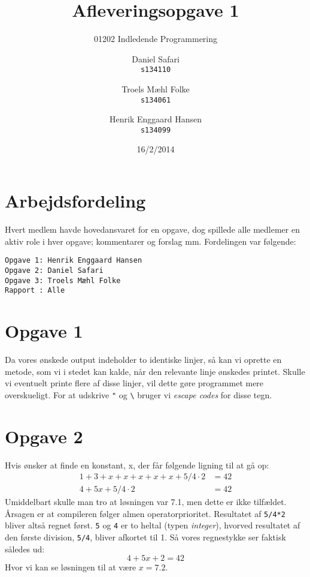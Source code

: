 \documentclass{scrartcl}
\newcommand\code[1]{\texttt{#1}}
\begin{document}

\title{Afleveringsopgave 1}
\subtitle{01202 Indledende Programmering}
\author{
  Daniel Safari\\
  \texttt{s134110}
  \and
  Troels Mæhl Folke\\
  \texttt{s134061}
   \and
  Henrik Enggaard Hansen\\
  \texttt{s134099}
}
\date{16/2/2014}
\maketitle
\thispagestyle{empty}
\setcounter{page}{0}
\null
\vfill
\section*{Arbejdsfordeling}
Hvert medlem havde hovedansvaret for en opgave, dog spillede alle medlemer en aktiv role i hver opgave; kommentarer og forslag mm. Fordelingen var følgende:
\begin{Verbatim}
Opgave 1: Henrik Enggaard Hansen
Opgave 2: Daniel Safari
Opgave 3: Troels Mæhl Folke
Rapport : Alle
\end{Verbatim}
\newpage
\section*{Opgave 1}
Da vores ønskede output indeholder to identiske linjer, så kan vi oprette en metode, som vi i stedet kan kalde, når den relevante linje ønskedes printet. Skulle vi eventuelt printe flere af disse linjer, vil dette gøre programmet mere overskueligt. For at udskrive \code{"} og \code{\textbackslash} bruger vi \emph{escape codes} for disse tegn.

\section*{Opgave 2}
Hvis ønsker at finde en konstant, x, der får følgende ligning til at gå op: 
\begin{align*}
1+3+x+x+x+x+x+5/4 \cdot 2 & = 42 \\
         4+5x+5/4 \cdot 2 & = 42
\end{align*}
Umiddelbart skulle man tro at løsningen var 7.1, men dette er ikke tilfældet. Årsagen er at compileren følger almen operatorprioritet. Resultatet af \code{5/4*2} bliver altså regnet først. \code{5} og \code{4} er to heltal (typen \emph{integer}), hvorved resultatet af den første division, \code{5/4}, bliver afkortet til 1. Så vores regnestykke ser faktisk således ud:
$$ 4+5x+2 = 42 $$
Hvor vi kan se løsningen til at være $x=7.2$.
\end{document}
